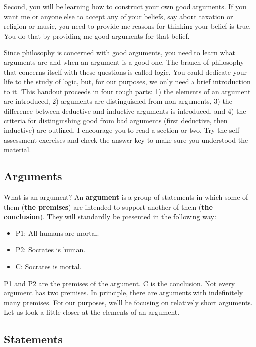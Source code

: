 \documentclass[]{article}
\providecommand{\tightlist}{%
  \setlength{\itemsep}{0pt}\setlength{\parskip}{0pt}}
\begin{document}
Second, you will be learning how to construct your own good arguments.
If you want me or anyone else to accept any of your beliefs, say about
taxation or religion or music, you need to provide me reasons for
thinking your belief is true. You do that by providing me good arguments
for that belief.

Since philosophy is concerned with good arguments, you need to learn
what arguments are and when an argument is a good one. The branch of
philosophy that concerns itself with these questions is called logic.
You could dedicate your life to the study of logic, but, for our
purposes, we only need a brief introduction to it. This handout proceeds
in four rough parts: 1) the elements of an argument are introduced, 2)
arguments are distinguished from non-arguments, 3) the difference
between deductive and inductive arguments is introduced, and 4) the
criteria for distinguishing good from bad arguments (first deductive,
then inductive) are outlined. I encourage you to read a section or two.
Try the self-assessment exercises and check the answer key to make sure
you understood the material.

\subsection{Arguments}\label{arguments}

What is an argument? An \textbf{argument} is a group of statements in
which some of them (\textbf{the premises}) are intended to support
another of them (\textbf{the conclusion}). They will standardly be
presented in the following way:

\begin{itemize}
\tightlist
\item
  P1: All humans are mortal.
\item
  P2: Socrates is human.
\item
  C: Socrates is mortal.
\end{itemize}

P1 and P2 are the premises of the argument. C is the conclusion. Not
every argument has two premises. In principle, there are arguments with
indefinitely many premises. For our purposes, we'll be focusing on
relatively short arguments. Let us look a little closer at the elements
of an argument.

\subsection{Statements}\label{statements}
\end{document}
